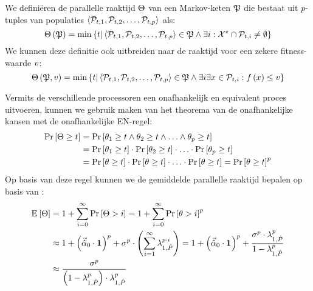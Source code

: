 \begin{definition}
We defini\"eren de parallelle raaktijd $\Theta$ van een Markov-keten $\mathfrak{P}$ die bestaat uit $p$-tuples van populaties $\left\langle \mathcal{P}_{t,1},\mathcal{P}_{t,2},\ldots,\mathcal{P}_{t,p}\right\rangle$ als:
\begin{equation}
\Theta\left(\mathfrak{P}\right)=\min\left\{ t|\left\langle \mathcal{P}_{t,1},\mathcal{P}_{t,2},\ldots,\mathcal{P}_{t,p}\right\rangle\in\mathfrak{P}\wedge\exists i:\mathcal{X}^{\star}\cap \mathcal{P}_{t,i}\neq\emptyset\right\}
\end{equation}
We kunnen deze definitie ook uitbreiden naar de raaktijd voor een zekere fitness-waarde $v$:
\begin{equation}
\Theta\left(\mathfrak{P},v\right)=\min\left\{ t|\left\langle \mathcal{P}_{t,1},\mathcal{P}_{t,2},\ldots,\mathcal{P}_{t,p}\right\rangle\in\mathfrak{P}\wedge\exists i\exists x\in\mathcal{P}_{t,i}:f\left(x\right)\leq v\right\}
\end{equation}
\end{definition}
Vermits de verschillende processoren een onafhankelijk en equivalent proces uitvoeren, kunnen we gebruik maken van het theorema van de onafhankelijke kansen met de onafhankelijke EN-regel:
\begin{equation}
\begin{aligned}
\Prob{\phittime\geq t}&=\Prob{\hittime_1\geq t\wedge\hittime_2\geq t\wedge\ldots\wedge\hittime_p\geq t}\\
&=\Prob{\hittime_1\geq t}\cdot\Prob{\hittime_2\geq t}\cdot\ldots\cdot\Prob{\hittime_p\geq t}\\
&=\Prob{\hittime\geq t}\cdot\Prob{\hittime\geq t}\cdot\ldots\cdot\Prob{\hittime\geq t}=\Prob{\hittime\geq t}^p
\end{aligned}
\eqnlab{probabilityPower}
\end{equation}
Op basis van deze regel kunnen we de gemiddelde parallelle raaktijd bepalen op basis van :
\begin{equation}
\begin{aligned}
\mean{\phittime}&=1+\displaystyle\sum_{i=0}^{\infty}{\Prob{\phittime>i}}=1+\displaystyle\sum_{i=0}^{\infty}{\Prob{\hittime>i}^p}\\
&\approx 1+\brak{\probdistnormmeta{0}\cdot\onematrix}^p+\metapa^p\cdot\brak{\displaystyle\sum_{i=1}^{\infty}\ev[1,\removmat]^{p\cdot i}}=1+\brak{\probdistnormmeta{0}\cdot\onematrix}^p+\displaystyle\frac{\metapa^p\cdot\ev[1,\removmat]^p}{1-\ev[1,\removmat]^p}\\
&\approx\displaystyle\frac{\metapa^p}{\brak{1-\ev[1,\removmat]^p}\cdot\ev[1,\removmat]^{p}}
\end{aligned}
\eqnlab{probabilityPower}
\end{equation}
